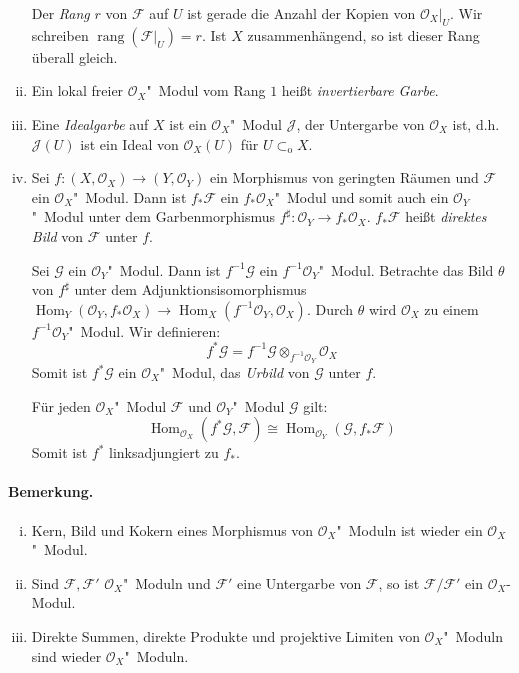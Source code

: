 \begin{enumerate}[(i)]
Der \textit{Rang} $r$ von $\mathcal{F}$ auf $U$ ist gerade die Anzahl der Kopien von $\mathcal{O}_X|_U$. Wir schreiben $\operatorname{rang}(\mathcal{F}|_U)=r$. Ist $X$ zusammenhängend, so ist dieser Rang überall gleich.
\item Ein lokal freier $\mathcal{O}_X$"~Modul vom Rang $1$ heißt \textit{invertierbare Garbe}.
\item Eine \textit{Idealgarbe} auf $X$ ist ein $\mathcal{O}_X$"~Modul $\mathcal{J}$, der Untergarbe von $\mathcal{O}_X$ ist, d.h. $\mathcal{J}(U)$ ist ein Ideal von $\mathcal{O}_X(U)$ für $U\subset_\text{o}X$.
\item Sei $f:(X,\mathcal{O}_X)\to (Y,\mathcal{O}_Y)$ ein Morphismus von geringten Räumen und $\mathcal{F}$ ein $\mathcal{O}_X$"~Modul. Dann ist $f_\ast\mathcal{F}$ ein $f_\ast\mathcal{O}_X$"~Modul und somit auch ein $\mathcal{O}_Y$"~Modul unter dem Garbenmorphismus $f^\sharp:\mathcal{O}_Y\to f_\ast\mathcal{O}_X$. $f_\ast\mathcal{F}$ heißt \textit{direktes Bild} von $\mathcal{F}$ unter $f$.

Sei $\mathcal{G}$ ein $\mathcal{O}_Y$"~Modul. Dann ist $f^{-1}\mathcal{G}$ ein $f^{-1}\mathcal{O}_Y$"~Modul. Betrachte das Bild $\theta$ von $f^\sharp$ unter dem Adjunktionsisomorphismus $\operatorname{Hom}_Y(\mathcal{O}_Y,f_\ast\mathcal{O}_X)\to\operatorname{Hom}_X(f^{-1}\mathcal{O}_Y,\mathcal{O}_X)$. Durch $\theta$ wird $\mathcal{O}_X$ zu einem $f^{-1}\mathcal{O}_Y$"~Modul. Wir definieren:
\[f^\ast\mathcal{G}= f^{-1}\mathcal{G}\otimes_{f^{-1}\mathcal{O}_Y}\mathcal{O}_X\]
Somit ist $f^\ast\mathcal{G}$ ein $\mathcal{O}_X$"~Modul, das \textit{Urbild} von $\mathcal{G}$ unter $f$.

Für jeden $\mathcal{O}_X$"~Modul $\mathcal{F}$ und $\mathcal{O}_Y$"~Modul $\mathcal{G}$ gilt:
\[\operatorname{Hom}_{\mathcal{O}_X}(f^\ast\mathcal{G},\mathcal{F})\cong\operatorname{Hom}_{\mathcal{O}_Y}(\mathcal{G},f_\ast\mathcal{F}) \]
Somit ist $f^\ast$ linksadjungiert zu $f_\ast$.
\end{enumerate}

\paragraph{Bemerkung.}\begin{enumerate}[(i)]
\item Kern, Bild und Kokern eines Morphismus von $\mathcal{O}_X$"~Moduln ist wieder ein $\mathcal{O}_X$"~Modul.
\item Sind $\mathcal{F},\mathcal{F}'$ $\mathcal{O}_X$"~Moduln und $\mathcal{F}'$ eine Untergarbe von $\mathcal{F}$, so ist $\mathcal{F}/\mathcal{F}'$ ein $\mathcal{O}_X$-Modul.
\item Direkte Summen, direkte Produkte und projektive Limiten von $\mathcal{O}_X$"~Moduln sind wieder $\mathcal{O}_X$"~Moduln.
\end{enumerate}

